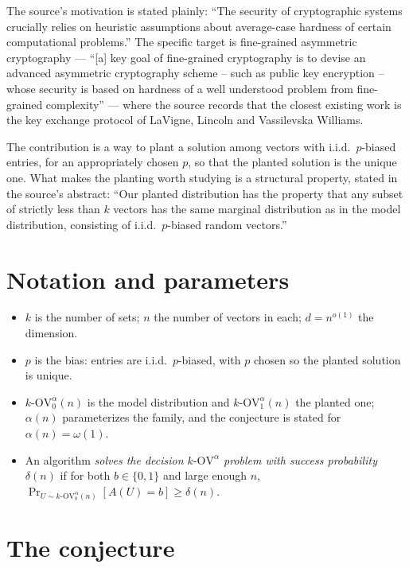 \documentclass{aicr-conjecture}
\newcommand{\kOV}{k\text{-}\mathrm{OV}}
\begin{document}
The source's motivation is stated plainly: ``The security of
cryptographic systems crucially relies on heuristic assumptions about
average-case hardness of certain computational problems.'' The specific
target is fine-grained asymmetric cryptography --- ``[a] key goal of
fine-grained cryptography is to devise an advanced asymmetric
cryptography scheme -- such as public key encryption -- whose security is
based on hardness of a well understood problem from fine-grained
complexity'' --- where the source records that the closest existing work is
the key exchange protocol of LaVigne, Lincoln and Vassilevska Williams.

The contribution is a way to plant a solution among vectors with
i.i.d.\ $p$-biased entries, for an appropriately chosen $p$, so that the
planted solution is the unique one. What makes the planting worth
studying is a structural property, stated in the source's abstract: ``Our
planted distribution has the property that any subset of strictly less
than $k$ vectors has the same marginal distribution as in the model
distribution, consisting of i.i.d.\ $p$-biased random vectors.''

\section{Notation and parameters}\label{sec:notation}

\begin{itemize}[nosep]
  \item $k$ is the number of sets; $n$ the number of vectors in each;
    $d = n^{o(1)}$ the dimension.
  \item $p$ is the bias: entries are i.i.d.\ $p$-biased, with $p$ chosen
    so the planted solution is unique.
  \item $\kOV^{\alpha}_{0}(n)$ is the model distribution and
    $\kOV^{\alpha}_{1}(n)$ the planted one; $\alpha(n)$ parameterizes the
    family, and the conjecture is stated for $\alpha(n) = \omega(1)$.
  \item An algorithm \emph{solves the decision $\kOV^{\alpha}$ problem
    with success probability $\delta(n)$} if for both $b \in \{0,1\}$ and
    large enough $n$, $\Pr_{U \sim \kOV^{\alpha}_{b}(n)}[A(U) = b] \ge
    \delta(n)$.
\end{itemize}

\section{The conjecture}\label{sec:conjectures}
\end{document}
